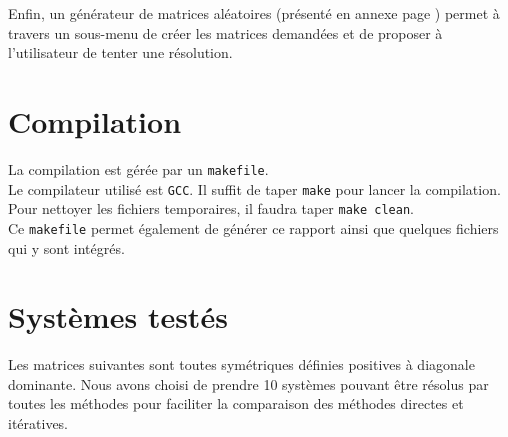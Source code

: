 \documentclass{report}
\begin{document}
  \vspace{0.3cm}
  Enfin, un générateur de matrices aléatoires (présenté en annexe page \pageref{generateur}) permet à travers un sous-menu de créer les matrices demandées et de proposer à l'utilisateur de tenter une résolution.

	\section{Compilation}
    La compilation est gérée par un \verb"makefile".\\
    Le compilateur utilisé est \verb"GCC".
    Il suffit de taper \verb"make" pour lancer la compilation.\\
    Pour nettoyer les fichiers temporaires, il faudra taper \verb"make clean".\\
    Ce \verb"makefile" permet également de générer ce rapport ainsi que quelques fichiers qui y sont intégrés.

	\newpage
	\section{Systèmes testés}
	  Les matrices suivantes sont toutes symétriques définies positives à diagonale dominante. Nous avons choisi de prendre 10 systèmes pouvant être résolus par toutes les méthodes pour faciliter la comparaison des méthodes directes et itératives.
	  \vspace{0.5cm}
	  
\end{document}
